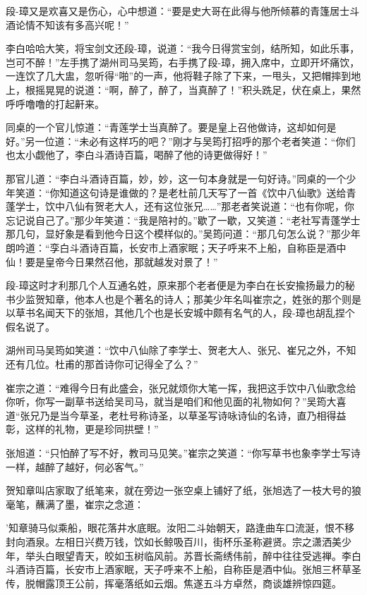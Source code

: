 \documentclass[12pt,oneside]{book}
\begin{document}
段-璋又是欢喜又是伤心，心中想道：``要是史大哥在此得与他所倾慕的青篷居士斗酒论情不知该有多高兴呢！''

李白哈哈大笑，将宝剑文还段-璋，说道：``我今日得赏宝剑，结所知，如此乐事，岂可不醉！''左手携了湖州司马吴筠，右手携了段-璋，拥入席中，立即开坏痛饮，一连饮了几大盅，忽听得``啪''的一声，他将鞋子除了下来，一甩头，又把帽摔到地上，根摇晃晃的说道：``啊，醉了，醉了，当真醉了！''积头跣足，伏在桌上，果然呼呼噜噜的打起鼾来。

同桌的一个官儿惊道：``青莲学士当真醉了。要是皇上召他做诗，这却如何是好。''另一位道：``未必有这样巧的吧？''刚才与吴筠打招呼的那个老者笑道：``你们也太小觑他了，李白斗酒诗百篇，喝醉了他的诗更做得好！''

那官儿道：``李白斗酒诗百篇，妙，妙，这一句本身就是一句好诗。''同桌的一个少年笑道：``你知道这句诗是谁做的？是老杜前几天写了一首《饮中八仙歌》送给青蓬学士，饮中八仙有贺老大人，还有这位张兄\ldots\ldots{}''那老者笑说道：``也有你呢，你忘记说自己了。''那少年笑道：``我是陪衬的。''歇了一歇，又笑道：``老社写青蓬学士那几句，显好象是看到他今日这个模样似的。''吴筠问道：``那几句怎么说？''那少年朗吟道：``孪白斗酒诗百篇，长安市上酒家眠；天子呼来不上船，自称臣是酒中仙！要是皇帝今日果然召他，那就越发对景了！''

段-璋这时才利那几个人互通名姓，原来那个老者便是为李白在长安揄扬最力的秘书少监贺知章，他本人也是个著名的诗人；那美少年名叫崔宗之，姓张的那个则是以草书名闻天下的张旭，其他几个也是长安城中颇有名气的人，段-璋也胡乱捏个假名说了。

湖州司马吴筠如笑道：``饮中八仙除了李学士、贺老大人、张兄、崔兄之外，不知还有几位。杜甫的那首诗你可记得全了么？''

崔宗之道：``难得今日有此盛会，张兄就烦你大笔一挥，我把这手饮中八仙歌念给你听，你写一副草书送给吴司马，就当是咱们和他见面的礼物如何？''吴筠大喜道``张兄乃是当今草圣，老杜号称诗圣，以草圣写诗咏诗仙的名诗，直乃相得益彰，这样的礼物，更是珍同拱壁！''

张旭道：``只怕醉了写不好，教司马见笑。''崔宗之笑道：``你写草书也象李学士写诗一样，越醉了越好，何必客气。''

贺知章叫店家取了纸笔来，就在旁边一张空桌上铺好了纸，张旭选了一枝大号的狼毫笔，蘸满了墨，崔宗之念道：

'知章骑马似乘船，眼花落井水底眠。汝阳二斗始朝天，路逢曲车口流涎，恨不移封向酒泉。左相日兴费万钱，饮如长鲸吸百川，街杯乐圣称避贤。宗之潇洒美少年，举头白眼望青天，皎如玉树临风前。苏晋长斋绣伟前，醉中往往受逃禅。李白斗酒诗百篇，长安市上酒家眠，天子呼来不上船，自称臣是酒中仙。张旭三杯草圣传，脱帽露顶王公前，挥毫落纸如云烟。焦遂五斗方卓然，商谈雄辨惊四筵。
\end{document}
